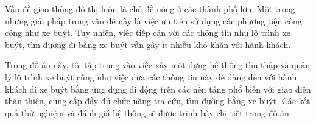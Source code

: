 \begin{vnabstract}
	\indent Vấn đề giao thông đô thị luôn là chủ đề nóng ở các thành phố lớn. Một trong những giải pháp trong vấn đề này là việc ưu tiên sử dụng các phương tiện công cộng như xe buýt. Tuy nhiên, việc tiếp cận với các thông tin như lộ trình xe buýt, tìm đường đi bằng xe buýt vẫn gây ít nhiều khó khăn với hành khách. %

	Trong đồ án này, tôi tập trung vào việc xây một dựng hệ thống thu thập và quản lý lộ trình xe buýt cũng như việc đưa các thông tin này dễ dàng đến với hành khách đi xe buýt bằng ứng dụng di động trên các nền tảng phổ biến với giao diện thân thiện, cung cấp đầy đủ chức năng tra cứu, tìm đường bằng xe buýt. Các kết quả thử nghiệm và đánh giá hệ thống sẽ được trình bày chi tiết trong đồ án.

	





\end{vnabstract}